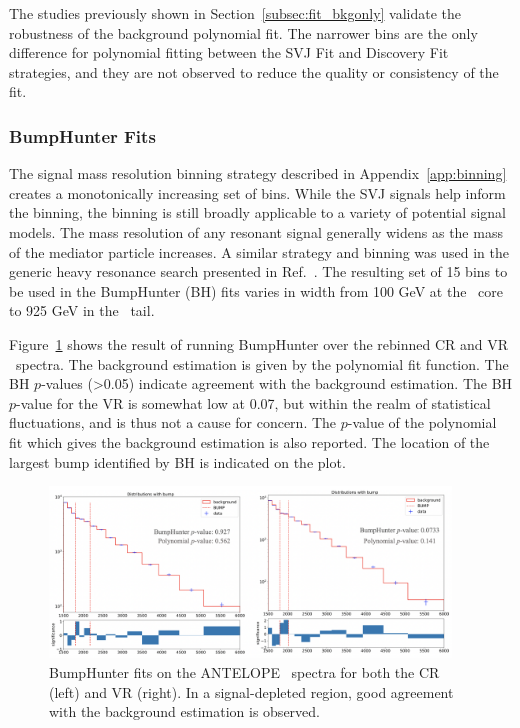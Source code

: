 The studies previously shown in Section~\ref{subsec:fit_bkgonly} validate the robustness of the background polynomial fit. 
The narrower bins are the only difference for polynomial fitting between the SVJ Fit and Discovery Fit strategies, and they are not observed to reduce the quality or consistency of the fit. 

\subsubsection{BumpHunter Fits}
\label{subsec:bhfits}

The signal mass resolution binning strategy described in Appendix~\ref{app:binning} creates a monotonically increasing set of bins. 
While the SVJ signals help inform the binning, the binning is still broadly applicable to a variety of potential signal models.
The mass resolution of any resonant signal generally widens as the mass of the mediator particle increases.
A similar strategy and binning was used in the generic heavy resonance search presented in Ref.~\cite{yxh}.
The resulting set of 15 bins to be used in the BumpHunter (BH) fits varies in width from 100 GeV at the \mt~core to 925 GeV in the \mt~tail. 

Figure~\ref{fig:antelope_bh_crvr} shows the result of running BumpHunter over the rebinned CR and VR \mt~spectra.
The background estimation is given by the polynomial fit function. 
The BH $p$-values (>0.05) indicate agreement with the background estimation.
The BH $p$-value for the VR is somewhat low at 0.07, but within the realm of statistical fluctuations, and is thus not a cause for concern.
The $p$-value of the polynomial fit which gives the background estimation is also reported.
The location of the largest bump identified by BH is indicated on the plot. 
\begin{figure}[!htbp]
\centering
   \includegraphics[width=0.95\textwidth]{figures/stats/antelope_bh_crvr}
    \caption{BumpHunter fits on the ANTELOPE \mt~spectra for both the CR (left) and VR (right). In a signal-depleted region, good agreement with the background estimation is observed.
    \label{fig:antelope_bh_crvr}}
\end{figure}

